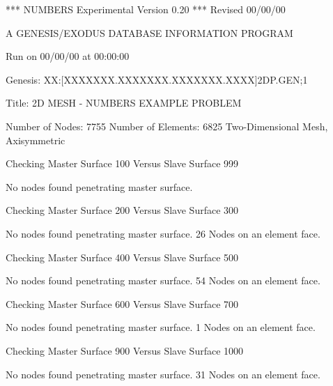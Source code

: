 
                    *** NUMBERS Experimental Version 0.20 ***
                                Revised 00/00/00

                  A GENESIS/EXODUS DATABASE INFORMATION PROGRAM

                           Run on 00/00/00 at 00:00:00

     Genesis: XX:[XXXXXXX.XXXXXXX.XXXXXXX.XXXX]2DP.GEN;1

     Title:   2D MESH - NUMBERS EXAMPLE PROBLEM 

     Number of Nodes:      7755
     Number of Elements:   6825
     Two-Dimensional Mesh, Axisymmetric

 Checking Master Surface   100 Versus Slave Surface   999

 No nodes found penetrating master surface.

 Checking Master Surface   200 Versus Slave Surface   300

 No nodes found penetrating master surface.
    26 Nodes on an element face.

 Checking Master Surface   400 Versus Slave Surface   500

 No nodes found penetrating master surface.
    54 Nodes on an element face.

 Checking Master Surface   600 Versus Slave Surface   700

 No nodes found penetrating master surface.
     1 Nodes on an element face.

 Checking Master Surface   900 Versus Slave Surface  1000

 No nodes found penetrating master surface.
    31 Nodes on an element face.
